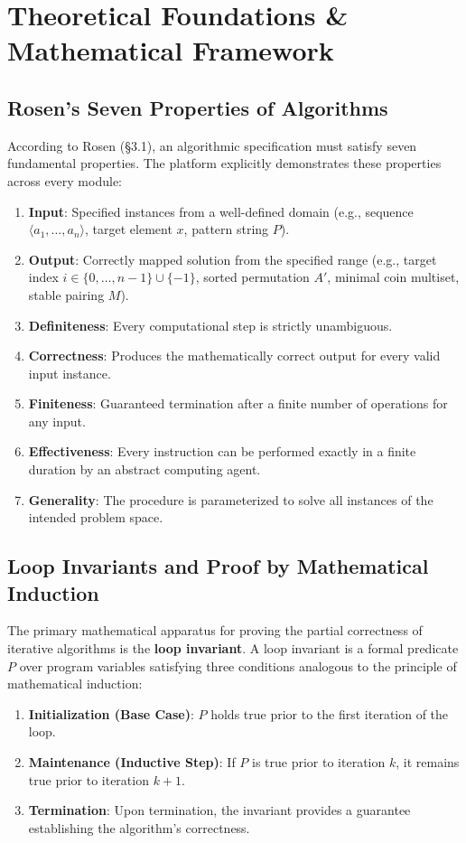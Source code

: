 \documentclass[11pt,a4paper]{article}
\theoremstyle{definition}
\theoremstyle{plain}
\theoremstyle{remark}
\begin{document}
\section{Theoretical Foundations \& Mathematical Framework}

\subsection{Rosen's Seven Properties of Algorithms}
According to Rosen (\S3.1), an algorithmic specification must satisfy seven fundamental properties. The platform explicitly demonstrates these properties across every module:
\begin{enumerate}
    \item \textbf{Input}: Specified instances from a well-defined domain (e.g., sequence $\langle a_1, \dots, a_n \rangle$, target element $x$, pattern string $P$).
    \item \textbf{Output}: Correctly mapped solution from the specified range (e.g., target index $i \in \{0, \dots, n-1\} \cup \{-1\}$, sorted permutation $A'$, minimal coin multiset, stable pairing $M$).
    \item \textbf{Definiteness}: Every computational step is strictly unambiguous.
    \item \textbf{Correctness}: Produces the mathematically correct output for every valid input instance.
    \item \textbf{Finiteness}: Guaranteed termination after a finite number of operations for any input.
    \item \textbf{Effectiveness}: Every instruction can be performed exactly in a finite duration by an abstract computing agent.
    \item \textbf{Generality}: The procedure is parameterized to solve all instances of the intended problem space.
\end{enumerate}

\subsection{Loop Invariants and Proof by Mathematical Induction}
The primary mathematical apparatus for proving the partial correctness of iterative algorithms is the \textbf{loop invariant}. A loop invariant is a formal predicate $P$ over program variables satisfying three conditions analogous to the principle of mathematical induction:
\begin{enumerate}
    \item \textbf{Initialization (Base Case)}: $P$ holds true prior to the first iteration of the loop.
    \item \textbf{Maintenance (Inductive Step)}: If $P$ is true prior to iteration $k$, it remains true prior to iteration $k+1$.
    \item \textbf{Termination}: Upon termination, the invariant provides a guarantee establishing the algorithm's correctness.
\end{enumerate}
\end{document}
